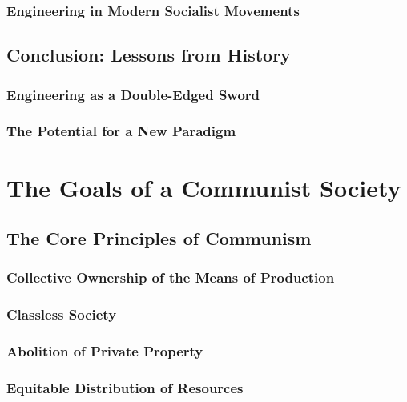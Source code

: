 \subsubsection{Engineering in Modern Socialist Movements}

\newpage

\subsection{Conclusion: Lessons from History}

\subsubsection{Engineering as a Double-Edged Sword}

\subsubsection{The Potential for a New Paradigm}

\newpage

\section{The Goals of a Communist Society}

\subsection{The Core Principles of Communism}

\subsubsection{Collective Ownership of the Means of Production}

\subsubsection{Classless Society}

\subsubsection{Abolition of Private Property}

\subsubsection{Equitable Distribution of Resources}

